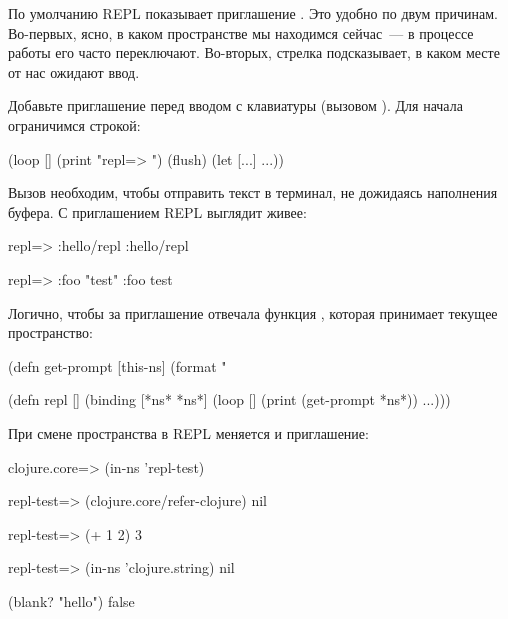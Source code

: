 
По умолчанию REPL показывает приглашение . Это удобно по двум причинам. Во-первых, ясно, в каком пространстве мы находимся сейчас~--- в процессе работы его часто переключают. Во-вторых, стрелка подсказывает, в каком месте от нас ожидают ввод.

Добавьте приглашение перед вводом с клавиатуры (вызовом ). Для начала ограничимся строкой:

\begin{english}
  \begin{clojure}
(loop []
  (print "repl=> ")
  (flush)
  (let [...]
    ...))
  \end{clojure}
\end{english}

Вызов  необходим, чтобы отправить текст в терминал, не дожидаясь наполнения буфера. С приглашением REPL выглядит живее:

\begin{english}
  \begin{clojure}
repl=> :hello/repl
:hello/repl

repl=> {:foo "test"}
{:foo test}
  \end{clojure}
\end{english}

Логично, чтобы за приглашение отвечала функция , которая принимает текущее пространство:

\begin{english}
  \begin{clojure/lines}
(defn get-prompt
  [this-ns]
  (format "%

(defn repl
  []
  (binding [*ns* *ns*]
    (loop []
      (print (get-prompt *ns*))
      ...)))
  \end{clojure/lines}
\end{english}

\pagebreaklarge

При смене пространства в REPL меняется и приглашение:

\begin{english}
  \begin{clojure}
clojure.core=> (in-ns 'repl-test)

repl-test=> (clojure.core/refer-clojure)
nil

repl-test=> (+ 1 2)
3

repl-test=> (in-ns 'clojure.string)
nil

(blank? "hello")
false
  \end{clojure}
\end{english}

